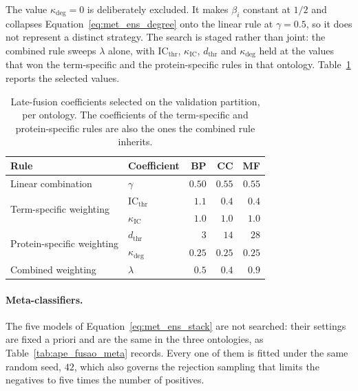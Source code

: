 \documentclass[Ingles]{ic-tese-v3}
\begin{document}
\begin{appendices}{}
The value $\kappa_{\deg} = 0$ is deliberately excluded. It makes $\beta_i$ constant at $1/2$ and
collapses Equation~\eqref{eq:met_ens_degree} onto the linear rule at $\gamma = 0.5$, so it does not
represent a distinct strategy. The search is staged rather than joint: the combined rule sweeps
$\lambda$ alone, with $\mathrm{IC}_{\text{thr}}$, $\kappa_{\mathrm{IC}}$, $d_{\text{thr}}$ and
$\kappa_{\deg}$ held at the values that won the term-specific and the protein-specific rules in that
ontology. Table~\ref{tab:ape_fusao_sel} reports the selected values.

\begin{table}[!htb]
  \centering
  \small
  \caption{Late-fusion coefficients selected on the validation partition, per ontology. The
  coefficients of the term-specific and protein-specific rules are also the ones the combined rule
  inherits.}
  \label{tab:ape_fusao_sel}
  \begin{tabular}{llrrr}
    \hline
    \textbf{Rule} & \textbf{Coefficient} & \textbf{BP} & \textbf{CC} & \textbf{MF} \\
    \hline
    Linear combination         & $\gamma$                       & $0.50$ & $0.55$ & $0.55$ \\
    \hline
    \multirow{2}{*}{Term-specific weighting}
                               & $\mathrm{IC}_{\text{thr}}$     & $1.1$  & $0.4$  & $0.4$ \\
                               & $\kappa_{\mathrm{IC}}$         & $1.0$  & $1.0$  & $1.0$ \\
    \hline
    \multirow{2}{*}{Protein-specific weighting}
                               & $d_{\text{thr}}$               & $3$    & $14$   & $28$ \\
                               & $\kappa_{\deg}$                & $0.25$ & $0.25$ & $0.25$ \\
    \hline
    Combined weighting         & $\lambda$                      & $0.5$  & $0.4$  & $0.9$ \\
    \hline
  \end{tabular}
\end{table}

\paragraph{Meta-classifiers.} The five models of Equation~\eqref{eq:met_ens_stack} are not searched:
their settings are fixed a priori and are the same in the three ontologies, as
Table~\ref{tab:ape_fusao_meta} records. Every one of them is fitted under the same random seed,
$42$, which also governs the rejection sampling that limits the negatives to five times the number
of positives.


\end{appendices}
\end{document}
